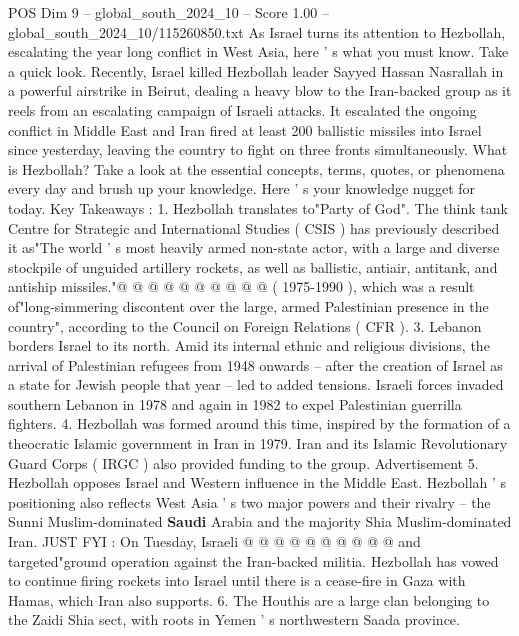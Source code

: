 \begin{textsample}{POS Dim 9 – global\_south\_2024\_10 – Score 1.00 – global\_south\_2024\_10/115260850.txt}  \label{ex:f9_pos_170}
As Israel turns its attention to Hezbollah, escalating the year long conflict in West Asia, here ' s what you must know.
Take a quick look.
Recently, Israel killed Hezbollah leader Sayyed Hassan Nasrallah in a powerful airstrike in Beirut, dealing a heavy blow to the Iran-backed group as it reels from an escalating campaign of Israeli attacks.
It escalated the ongoing conflict in Middle East and Iran fired at least 200 ballistic missiles into Israel since yesterday, leaving the country to fight on three fronts simultaneously.
What is Hezbollah?
Take a look at the essential concepts, terms, quotes, or phenomena every day and brush up your knowledge.
Here ' s your knowledge nugget for today.
Key Takeaways : 1.
Hezbollah translates to"Party of God".
The think tank Centre for Strategic and International Studies ( CSIS ) has previously described it as"The world ' s most heavily armed non-state actor, with a large and diverse stockpile of unguided artillery rockets, as well as ballistic, antiair, antitank, and antiship missiles."@ @ @ @ @ @ @ @ @ @ ( 1975-1990 ), which was a result of"long-simmering discontent over the large, armed Palestinian presence in the country", according to the Council on Foreign Relations ( CFR ). 3.
Lebanon borders Israel to its north.
Amid its internal ethnic and religious divisions, the arrival of Palestinian refugees from 1948 onwards -- after the creation of Israel as a state for Jewish people that year -- led to added tensions.
Israeli forces invaded southern Lebanon in 1978 and again in 1982 to expel Palestinian guerrilla fighters. 4.
Hezbollah was formed around this time, inspired by the formation of a theocratic Islamic government in Iran in 1979.
Iran and its Islamic Revolutionary Guard Corps ( IRGC ) also provided funding to the group.
Advertisement 5.
Hezbollah opposes Israel and Western influence in the Middle East.
Hezbollah ' s positioning also reflects West Asia ' s two major powers and their rivalry -- the Sunni Muslim-dominated \textbf{Saudi} Arabia and the majority Shia Muslim-dominated Iran.
JUST FYI : On Tuesday, Israeli @ @ @ @ @ @ @ @ @ @ and targeted"ground operation against the Iran-backed militia.
Hezbollah has vowed to continue firing rockets into Israel until there is a cease-fire in Gaza with Hamas, which Iran also supports. 6.
The Houthis are a large clan belonging to the Zaidi Shia sect, with roots in Yemen ' s northwestern Saada province.

\end{textsample}
